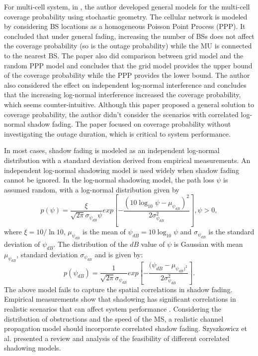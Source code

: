 \documentclass[journal,comsoc]{IEEEtran}
\begin{document}
\par For multi-cell system, in \cite{andrews2011tractable}, the author developed general models for the multi-cell coverage probability using stochastic geometry. The cellular network is modeled by considering BS locations as a homogeneous Poisson Point Process (PPP). It concluded that under general fading, increasing the number of BSs does not affect the coverage probability (so is the outage probability) while the MU is connected to the nearest BS. The paper also did comparison between grid model and the random PPP model and concludes that  the grid model provides the upper bound of the coverage probability while the PPP provides the lower bound. The author also considered the effect on independent log-normal interference and concludes that the increasing log-normal interference increased the coverage probability, which seems counter-intuitive. Although this paper proposed a general solution to coverage probability, the author didn't consider the scenarios with correlated log-normal shadow fading. The paper focused on coverage probability without investigating the outage duration, which is critical to system performance.
\par In most cases, shadow fading is modeled as an independent log-normal distribution \cite{goldsmith2005wireless} with a standard deviation derived from empirical measurements. An independent log-normal shadowing model is used widely when shadow fading cannot be ignored. In the log-normal shadowing model, the path loss $\psi$ is assumed random, with a log-normal distribution given by
\begin{equation}
p(\psi)=\frac{\xi}{\sqrt{2\pi}\sigma_{\psi_{dB}}\psi}exp[-\frac{(10\log_{10}\psi-\mu_{\psi_{dB}})^{2}}{2\sigma_{\psi_{dB}}^{2}}], \psi>0,
\end{equation}
where $\xi=10/\ln10$, $\mu_{\psi_{dB}}$ is the mean of $\psi_{dB}=10\log_{10}\psi$ and $\sigma_{\psi_{dB}}$ is the standard deviation of $\psi_{dB}$.
The distribution of the $dB$ value of $\psi$ is Gaussian with mean $\mu_{\psi_{dB}}$, standard deviation $\sigma_{\psi_{dB}}$ and is given by:
\begin{equation}
p(\psi_{dB})=\frac{1}{\sqrt{2\pi}\sigma_{\psi_{dB}}}exp[-\frac{(\psi_{dB}-\mu_{\psi_{dB})^2}}{2\sigma_{\psi_{dB}}^2}].
\end{equation}
The above model fails to capture the spatial correlations in shadow fading. Empirical measurements show that shadowing has significant correlations in realistic scenarios that can affect system performance \cite{graziano1978propagation}. Considering the distribution of obstructions and the speed of the MS, a realistic channel propagation model should incorporate correlated shadow fading.  Szyszkowicz et al. \cite{szyszkowicz2010feasibility} presented a review and analysis of the feasibility of different correlated shadowing models.
\end{document}
